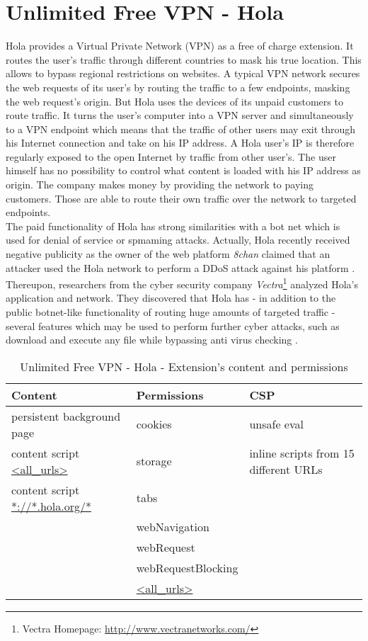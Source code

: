 \section{Unlimited Free VPN - Hola}
	Hola provides a Virtual Private Network (VPN) as a free of charge extension. It routes the user's traffic through different countries to mask his true location. This allows to bypass regional restrictions on websites. A typical VPN network secures the web requests of its user's by routing the traffic to a few endpoints, masking the web request's origin. But Hola uses the devices of its unpaid customers to route traffic. It turns the user's computer into a VPN server and simultaneously to a VPN endpoint which means that the traffic of other users may exit through his Internet connection and take on his IP address. A Hola user's IP is therefore regularly exposed to the open Internet by traffic from other user's. The user himself has no possibility to control what content is loaded with his IP address as origin. The company makes money by providing the network to paying customers. Those are able to route their own traffic over the network to targeted endpoints. \\
	
	The paid functionality of Hola has strong similarities with a bot net which is used for denial of service or spmaming attacks. Actually, Hola recently received negative publicity as the owner of the web platform \textit{8chan} claimed that an attacker used the Hola network to perform a DDoS attack against his platform \cite{8chanHola}. Thereupon, researchers from the cyber security company \textit{Vectra}\footnote{Vectra Homepage: \url{http://www.vectranetworks.com/}} analyzed Hola's application and network. They discovered that Hola has - in addition to the public botnet-like functionality of routing huge amounts of targeted traffic - several features which may be used to perform further cyber attacks, such as download and execute any file while bypassing anti virus checking \cite{vectraHola}. \\ 
	
	\begin{table}[h]
		\centering
		\begin{tabular}{|l|l|l|} \hline
			\textbf{Content} & \textbf{Permissions} & \textbf{CSP} \\ \hline
			persistent background page & cookies & unsafe eval\\
			content script  \url{<all_urls>} & storage & inline scripts from 15 different URLs \\
			content script \url{*://*.hola.org/*} & tabs & \\ 
			& webNavigation & \\ 
			& webRequest & \\ 
			& webRequestBlocking & \\ 
			& \url{<all_urls>} & \\ \hline
		\end{tabular}
		\caption{Unlimited Free VPN - Hola - Extension's content and permissions}
	\end{table}
	
